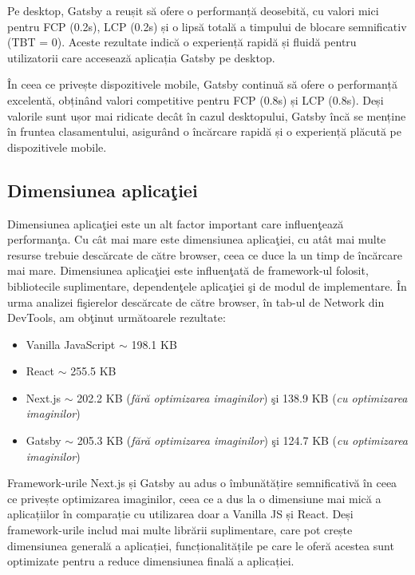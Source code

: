\documentclass[12pt, a4paper]{report}
\begin{document}
Pe desktop, Gatsby a reușit să ofere o performanță deosebită, cu valori mici pentru FCP (0.2s), LCP (0.2s) și o lipsă totală a timpului de blocare semnificativ (TBT = 0). Aceste rezultate indică o experiență rapidă și fluidă pentru utilizatorii care accesează aplicația Gatsby pe desktop.

În ceea ce privește dispozitivele mobile, Gatsby continuă să ofere o performanță excelentă, obținând valori competitive pentru FCP (0.8s) și LCP (0.8s). Deși valorile sunt ușor mai ridicate decât în cazul desktopului, Gatsby încă se menține în fruntea clasamentului, asigurând o încărcare rapidă și o experiență plăcută pe dispozitivele mobile.

\subsection{Dimensiunea aplica\c tiei}

Dimensiunea aplica\c tiei este un alt factor important care influen\c teaz\u a performan\c ta. Cu c\^ at mai mare este dimensiunea aplica\c tiei, cu at\^ at mai multe resurse trebuie desc\u arcate de c\u atre browser, ceea ce duce la un timp de \^ inc\u arcare mai mare. Dimensiunea aplica\c tiei este influen\c tat\u a de framework-ul folosit, bibliotecile suplimentare, dependen\c tele aplica\c tiei \c si de modul de implementare.
\^In urma analizei fi\c sierelor desc\u arcate de c\u atre browser, \^in tab-ul de Network din DevTools, am ob\c tinut urm\u atoarele rezultate:

\begin{itemize}
	\item Vanilla JavaScript \(\sim \) 198.1 KB
	\item React \(\sim \) 255.5 KB
	\item Next.js \(\sim \) 202.2 KB (\textit{f\u ar\u a optimizarea imaginilor}) \c si 138.9 KB (\textit{cu optimizarea imaginilor})
	\item Gatsby \(\sim \) 205.3 KB (\textit{f\u ar\u a optimizarea imaginilor}) \c si 124.7 KB (\textit{cu optimizarea imaginilor}) 
\end{itemize}

Framework-urile Next.js și Gatsby au adus o îmbunătățire semnificativă în ceea ce privește optimizarea imaginilor, ceea ce a dus la o dimensiune mai mică a aplicațiilor în comparație cu utilizarea doar a Vanilla JS și React. Deși framework-urile includ mai multe librării suplimentare, care pot crește dimensiunea generală a aplicației, funcționalitățile pe care le oferă acestea sunt optimizate pentru a reduce dimensiunea finală a aplicației.
\end{document}
